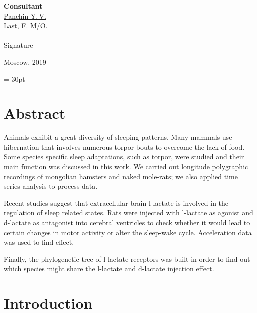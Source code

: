 \documentclass[14pt,a4paper]{scrartcl}
\begin{document}
\begin{titlepage}
  \hfill\begin{minipage}{0.4\textwidth}
    \textbf{Consultant}\\[0.3cm]
    \underline{Panchin Y.\,V.} \\
    \scriptsize{Last, F. M/O.}\\\\
    \underline{\hspace{7cm}}
    \scriptsize{Signature}\\
      \end{minipage}

      \vfill
      \vfill
      \vfill  

    \begin{center}
    \vfill
      Moscow, 2019
    \end{center}
  \end{titlepage}


\newpage
\tableofcontents
\fancyhf{} 
\renewcommand{\headrulewidth}{0pt} 
\footskip = 30pt
\fancyfoot[R]{\thepage} 
\pagestyle{fancy}
\fancypagestyle{plain}{
  \fancyhf{}
  \renewcommand{\headrulewidth}{0pt}
  \fancyhf[lef,rof]{\thepage}
}

\newpage
\section{Abstract}
\label{sec:Abstract}

Animals exhibit a great diversity of sleeping patterns. Many mammals use hibernation that involves numerous torpor bouts to overcome the lack of food. Some species specific sleep adaptations, such as torpor, were studied and their main function was discussed in this work. We carried out longitude polygraphic recordings of mongolian hamsters and naked mole-rats; we also applied time series analysis to process data.

Recent studies suggest that extracellular brain l-lactate is involved in the regulation of sleep related states. Rats were injected with l-lactate as agonist and d-lactate as antagonist into cerebral ventricles to check whether it would lead to certain changes in motor activity or alter the sleep-wake cycle. Acceleration data was used to find effect. 

Finally, the phylogenetic tree of l-lactate receptors was built in order to find out which species might share the l-lactate and d-lactate injection effect. 

\newpage
\section{Introduction}
\label{sec:Introduction}
\end{document}
